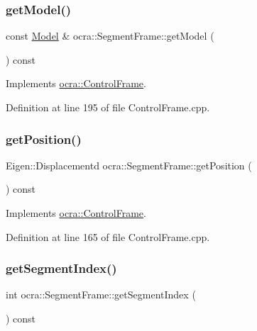 \subsubsection{\texorpdfstring{get\+Model()}{getModel()}}
{\footnotesize\ttfamily const \hyperlink{classocra_1_1Model}{Model} \& ocra\+::\+Segment\+Frame\+::get\+Model (\begin{DoxyParamCaption}{ }\end{DoxyParamCaption}) const\hspace{0.3cm}{\ttfamily [virtual]}}



Implements \hyperlink{classocra_1_1ControlFrame_ab8a1e5e3d96d7524112b4c88bf0bc5ee}{ocra\+::\+Control\+Frame}.



Definition at line 195 of file Control\+Frame.\+cpp.

\hypertarget{classocra_1_1SegmentFrame_ad0c5aa3b15b384cd5a4774ddd534b32e}{}\label{classocra_1_1SegmentFrame_ad0c5aa3b15b384cd5a4774ddd534b32e} 
\subsubsection{\texorpdfstring{get\+Position()}{getPosition()}}
{\footnotesize\ttfamily Eigen\+::\+Displacementd ocra\+::\+Segment\+Frame\+::get\+Position (\begin{DoxyParamCaption}{ }\end{DoxyParamCaption}) const\hspace{0.3cm}{\ttfamily [virtual]}}



Implements \hyperlink{classocra_1_1ControlFrame_aaadbbfbcdd5b8e197a0f181ffb2fdcbe}{ocra\+::\+Control\+Frame}.



Definition at line 165 of file Control\+Frame.\+cpp.

\hypertarget{classocra_1_1SegmentFrame_a8f651dccb13afc25504531efd17c8eef}{}\label{classocra_1_1SegmentFrame_a8f651dccb13afc25504531efd17c8eef} 
\subsubsection{\texorpdfstring{get\+Segment\+Index()}{getSegmentIndex()}}
{\footnotesize\ttfamily int ocra\+::\+Segment\+Frame\+::get\+Segment\+Index (\begin{DoxyParamCaption}{ }\end{DoxyParamCaption}) const}



